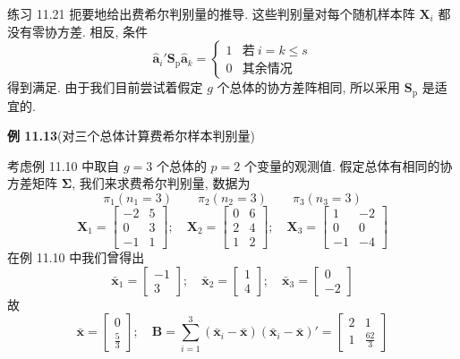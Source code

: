 练习 11.21 扼要地给出费希尔判别量的推导. 这些判别量对每个随机样本阵 $\mathbf{X}_i$ 都没有零协方差. 相反, 条件
\label{eq:11-63}
\begin{equation}
\hat{\mathbf{a}}_i'\mathbf{S}_{\mathrm{p}}\hat{\mathbf{a}}_k=\begin{cases}1&\text{若}\ i=k\le s\\ 0&\text{其余情况}\end{cases}
\tag{11-63}
\end{equation}
得到满足. 由于我们目前尝试着假定 $g$ 个总体的协方差阵相同, 所以采用 $\mathbf{S}_{\mathrm{p}}$ 是适宜的.

\noindent\textbf{例 11.13}\quad (对三个总体计算费希尔样本判别量)

考虑例 11.10 中取自 $g=3$ 个总体的 $p=2$ 个变量的观测值. 假定总体有相同的协方差矩阵 $\boldsymbol{\Sigma}$, 我们来求费希尔判别量, 数据为
\[
\pi_1(n_1=3)\qquad \pi_2(n_2=3)\qquad \pi_3(n_3=3)
\]
\[
\mathbf{X}_1=\begin{bmatrix}-2&5\\0&3\\-1&1\end{bmatrix};\quad
\mathbf{X}_2=\begin{bmatrix}0&6\\2&4\\1&2\end{bmatrix};\quad
\mathbf{X}_3=\begin{bmatrix}1&-2\\0&0\\-1&-4\end{bmatrix}
\]
在例 11.10 中我们曾得出
\[
\bar{\mathbf{x}}_1=\begin{bmatrix}-1\\3\end{bmatrix};\quad
\bar{\mathbf{x}}_2=\begin{bmatrix}1\\4\end{bmatrix};\quad
\bar{\mathbf{x}}_3=\begin{bmatrix}0\\-2\end{bmatrix}
\]
故
\[
\bar{\mathbf{x}}=\begin{bmatrix}0\\ \frac{5}{3}\end{bmatrix};\quad
\mathbf{B}=\sum_{i=1}^{3}(\bar{\mathbf{x}}_i-\bar{\mathbf{x}})(\bar{\mathbf{x}}_i-\bar{\mathbf{x}})'=\begin{bmatrix}2&1\\1&\frac{62}{3}\end{bmatrix}
\]
